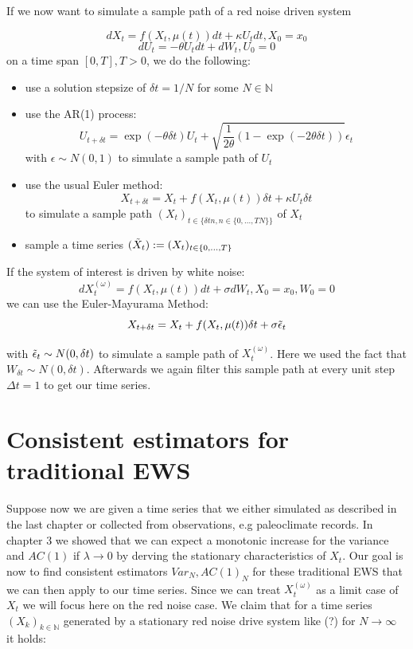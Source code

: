 \documentclass[%
thesis=student,%
coverpage=false,%
titlepage=false,%
headmarks=true, %
german,%
font=libertine, %
math=newpxtx, %
BCOR=5mm,%
coverBCOR=11mm%
]{tumbook}
\begin{document}
If we now want to simulate a sample path of a red noise driven system

\[ 
     dX_{t} = f(X_{t},\mu(t))dt + \kappa U_{t}dt, X_{0} = x_{0}
\]
\[
     dU_{t} = -\theta U_{t}dt + dW_{t}, U_{0} = 0
\]
on a time span $[0,T], T > 0$, we do the following: 
\begin{itemize}
    \item use a solution stepsize of $\delta t = 1/N$ for some $N \in \mathbb{N}$
    \item use the AR(1) process:
    \[
    U_{t+\delta t} = \exp(-\theta \delta t)U_{t} + \sqrt{\frac{1}{2\theta}(1-\exp(-2\theta \delta t))}\epsilon_{t}
    \]
    with $\epsilon \sim N(0,1)$ to simulate a sample path of $U_{t}$
    \item use the usual Euler method:
    \[
        X_{t+\delta t} = X_{t} + f(X_{t},\mu(t))\delta t + \kappa U_{t}\delta t
    \]
    to simulate a sample path $(X_{t})_{t\in\{\delta t n, n \in \{0,...,TN\}\}}$ of $X_{t}$
    \item sample a time series $(\Tilde{X}_t) := (X_t)_{t\in\{0,...,T\}}$
\end{itemize}


If the system of interest is driven by white noise: 
\[
    dX_{t}^{(\omega)} = f(X_{t},\mu(t))dt + \sigma dW_{t}, X_{0} = x_{0}, W_{0} = 0
\]
we can use the Euler-Mayurama Method:
\[
X_{t+\delta t} = X_{t} + f(X_{t},\mu(t))\delta t + \sigma\Tilde{\epsilon}_t
\]

with $\Tilde{\epsilon}_t \sim N(0,\delta t)$ to simulate a sample path of $X_{t}^{(\omega)}$. Here we used the fact that $W_{\delta t} \sim N(0,\delta t)$. Afterwards we again filter this sample path at every unit step $\Delta t = 1$ to get our time series.



\chapter{Consistent estimators for traditional EWS}

Suppose now we are given a time series that we either simulated as described in the last chapter or collected from observations, e.g paleoclimate records. In chapter 3 we showed that we can expect a monotonic increase for the variance and $AC(1)$ if $\lambda \rightarrow 0$ by derving the stationary characteristics of $X_{t}$. Our goal is now to find consistent estimators $Var_N, AC(1)_N$ for these traditional EWS that we can then apply to our time series. Since we can treat $X_{t}^{(\omega)}$ as a limit case of $X_{t}$ we will focus here on the red noise case. We claim that for a time series $(X_{k})_{k\in\mathbb{N}}$ generated by a stationary red noise drive system like (?) for $N \rightarrow \infty$ it holds:
\end{document}
